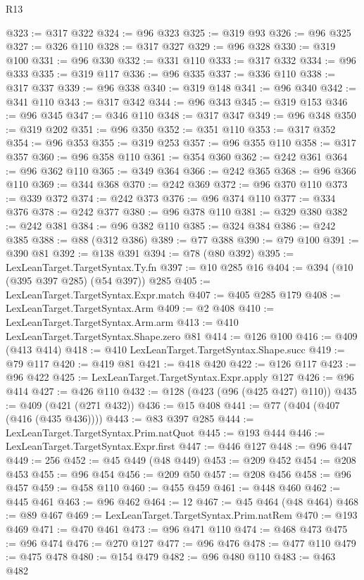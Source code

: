 \begin{lexlean}{R13}
\begin{coremodule}
@323 := @317 @322
@324 := @96 @323
@325 := @319 @93
@326 := @96 @325
@327 := @326 @110
@328 := @317 @327
@329 := @96 @328
@330 := @319 @100
@331 := @96 @330
@332 := @331 @110
@333 := @317 @332
@334 := @96 @333
@335 := @319 @117
@336 := @96 @335
@337 := @336 @110
@338 := @317 @337
@339 := @96 @338
@340 := @319 @148
@341 := @96 @340
@342 := @341 @110
@343 := @317 @342
@344 := @96 @343
@345 := @319 @153
@346 := @96 @345
@347 := @346 @110
@348 := @317 @347
@349 := @96 @348
@350 := @319 @202
@351 := @96 @350
@352 := @351 @110
@353 := @317 @352
@354 := @96 @353
@355 := @319 @253
@357 := @96 @355 @110
@358 := @317 @357
@360 := @96 @358 @110
@361 := @354 @360
@362 := @242 @361
@364 := @96 @362 @110
@365 := @349 @364
@366 := @242 @365
@368 := @96 @366 @110
@369 := @344 @368
@370 := @242 @369
@372 := @96 @370 @110
@373 := @339 @372
@374 := @242 @373
@376 := @96 @374 @110
@377 := @334 @376
@378 := @242 @377
@380 := @96 @378 @110
@381 := @329 @380
@382 := @242 @381
@384 := @96 @382 @110
@385 := @324 @384
@386 := @242 @385
@388 := @88 (@312 @386)
@389 := @77 @388
@390 := @79 @100
@391 := @390 @81
@392 := @138 @391
@394 := @78 (@80 @392)
@395 := LexLeanTarget.TargetSyntax.Ty.fn
@397 := @10 @285 @16
@404 := @394 (@10 (@395 @397 @285) (@54 @397)) @285
@405 := LexLeanTarget.TargetSyntax.Expr.match
@407 := @405 @285 @179
@408 := LexLeanTarget.TargetSyntax.Arm
@409 := @2 @408
@410 := LexLeanTarget.TargetSyntax.Arm.arm
@413 := @410 LexLeanTarget.TargetSyntax.Shape.zero @81
@414 := @126 @100
@416 := @409 (@413 @414)
@418 := @410 LexLeanTarget.TargetSyntax.Shape.succ
@419 := @79 @117
@420 := @419 @81
@421 := @418 @420
@422 := @126 @117
@423 := @96 @422
@425 := LexLeanTarget.TargetSyntax.Expr.apply @127
@426 := @96 @414
@427 := @426 @110
@432 := @128 (@423 (@96 (@425 @427) @110))
@435 := @409 (@421 (@271 @432))
@436 := @15 @408
@441 := @77 (@404 (@407 (@416 (@435 @436))))
@443 := @83 @397 @285
@444 := LexLeanTarget.TargetSyntax.Prim.natQuot
@445 := @193 @444
@446 := LexLeanTarget.TargetSyntax.Expr.first
@447 := @446 @127
@448 := @96 @447
@449 := 256
@452 := @45 @449 (@48 @449)
@453 := @209 @452
@454 := @208 @453
@455 := @96 @454
@456 := @209 @50
@457 := @208 @456
@458 := @96 @457
@459 := @458 @110
@460 := @455 @459
@461 := @448 @460
@462 := @445 @461
@463 := @96 @462
@464 := 12
@467 := @45 @464 (@48 @464)
@468 := @89 @467
@469 := LexLeanTarget.TargetSyntax.Prim.natRem
@470 := @193 @469
@471 := @470 @461
@473 := @96 @471 @110
@474 := @468 @473
@475 := @96 @474
@476 := @270 @127
@477 := @96 @476
@478 := @477 @110
@479 := @475 @478
@480 := @154 @479
@482 := @96 @480 @110
@483 := @463 @482

\end{coremodule}
\end{lexlean}
